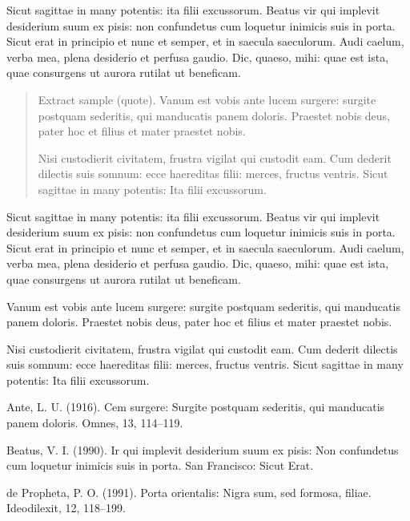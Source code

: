 \documentclass[pdftex,crc]{ios-book}
\begin{document}
Sicut sagittae in many potentis: ita filii excussorum. Beatus vir qui
implevit desiderium suum ex pisis: non confundetus cum loquetur inimicis
suis in porta.  Sicut erat in principio et nunc et semper, et in saecula
saeculorum. Audi caelum, verba mea, plena desiderio et perfusa gaudio.
Dic, quaeso, mihi: quae est ista, quae consurgens ut aurora rutilat ut
beneficam.

\begin{quote}
Extract sample (quote). Vanum est vobis ante lucem surgere: surgite postquam
sederitis, qui manducatis panem doloris. Praestet nobis deus, pater
hoc et filius et mater praestet nobis.

Nisi custodierit civitatem,
frustra vigilat qui custodit eam. Cum dederit dilectis suis somnum:
ecce haereditas filii: merces, fructus ventris. Sicut sagittae in
many potentis: Ita filii excussorum.
\end{quote}

Sicut sagittae in many potentis: ita filii excussorum. Beatus vir qui
implevit desiderium suum ex pisis: non confundetus cum loquetur inimicis
suis in porta.  Sicut erat in principio et nunc et semper, et in saecula
saeculorum. Audi caelum, verba mea, plena desiderio et perfusa gaudio.
Dic, quaeso, mihi: quae est ista, quae consurgens ut aurora rutilat ut
beneficam.

\begin{description}
\item[Description label.] Vanum est vobis ante lucem surgere: surgite postquam
sederitis, qui manducatis panem doloris. Praestet nobis deus, pater
hoc et filius et mater praestet nobis.

\item Nisi custodierit civitatem,
frustra vigilat qui custodit eam. Cum dederit dilectis suis somnum:
ecce haereditas filii: merces, fructus ventris. Sicut sagittae in
many potentis: Ita filii excussorum.
\end{description}

\begin{thebibliography}{99}
Ante, L. U. (1916). Cem surgere: Surgite postquam sederitis, qui
manducatis panem doloris. Omnes, 13, 114--119.

Beatus, V. I. (1990). Ir qui implevit desiderium suum ex pisis: Non
confundetus cum loquetur inimicis suis in porta. San Francisco: Sicut
Erat.

de Propheta, P. O. (1991). Porta orientalis: Nigra sum, sed formosa,
filiae. Ideodilexit, 12, 118--199.

\end{thebibliography}
\end{document}
